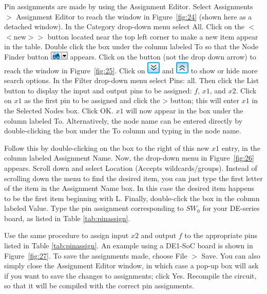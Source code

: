 \documentclass[11pt, twoside, pdftex]{article}
\begin{document}
Pin assignments are made by using the Assignment Editor. 
Select {\sf Assignments $>$ Assignment Editor} to reach the window in Figure~\ref{fig:24}
(shown here as a detached window).
In the {\sf Category} drop-down menu select {\sf All}. Click on the {\sf $<$$<$new$>$$>$} button
located near the top left corner to make a new item appear in the table. Double click the box
under the column labeled To so that the Node Finder button \includegraphics[scale=0.65]{figures/icon7.png}
appears. Click on the button (not the drop down arrow) to reach the window in Figure~\ref{fig:25}. Click on \includegraphics[scale=0.6]{figures/icon12.png} and \includegraphics[scale=0.6]{figures/icon15.png} to show or hide more search options.
In the {\sf Filter} drop-down menu select {\sf Pins: all}. Then click the {\sf List} button to display
the input and output pins to be assigned: $f$, $x1$, and $x2$.
Click on $x1$ as the first pin to be assigned and click the {\sf >} button; this will enter
$x1$ in the Selected Nodes box.  Click {\sf OK}. $x1$ will now appear in the box under the column
labeled To. Alternatively, the node name can be entered directly by double-clicking the box
under the To column and typing in the node name.

Follow this by double-clicking on the box to the right of this new $x1$ entry, in the column
labeled Assignment Name. Now, the drop-down menu in Figure~\ref{fig:26} appears. Scroll down and select 
{\sf Location (Accepts wildcards/groups)}. Instead of scrolling down the menu to find the desired item, 
you can just type the first letter of the item in the Assignment Name box. In this case the desired
item happens to be the first item beginning with L. Finally, double-click the box in the column labeled Value.
Type the pin assignment corresponding to $SW_0$ for your DE-series board, as listed in Table \ref{tab:pinassign}.

Use the same procedure to assign input $x2$ and output $f$ to the appropriate pins listed in
Table \ref{tab:pinassign}. An example using a DE1-SoC board is shown in Figure~\ref{fig:27}.
To save the assignments made, choose {\sf File $>$ Save}. You can also simply close 
the Assignment Editor window, in which case a pop-up box will ask if you want to save
the changes to assignments; click {\sf Yes}.
Recompile the circuit, so that it will be compiled with the correct pin assignments.
\end{document}
